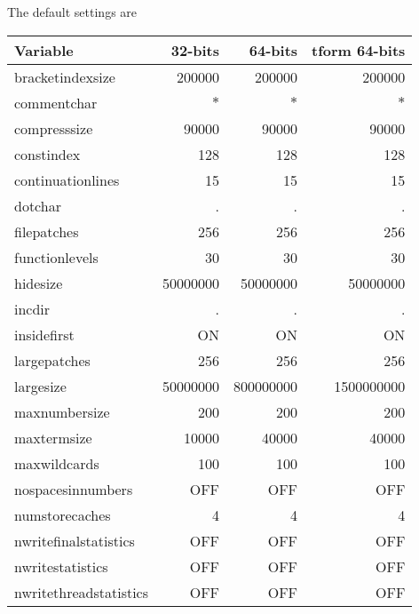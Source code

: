 The default settings are
\begin{center}
\begin{tabular}{lrrr}
Variable         &      32-bits       &    64-bits  & tform 64-bits   \\ \hline
bracketindexsize &      200000        & 200000      & 200000       \\
commentchar &           $*$           & $*$         & $*$          \\
compresssize &          90000         & 90000       & 90000        \\
constindex &            128           & 128         & 128          \\
continuationlines &     15            & 15          & 15           \\
dotchar &               .             & .           & .            \\
filepatches &           256           & 256         & 256          \\
functionlevels &        30            & 30          & 30           \\
hidesize &              50000000      & 50000000    & 50000000     \\
incdir &                .             & .           & .            \\
insidefirst &           ON            & ON          & ON           \\
largepatches &          256           & 256         & 256          \\
largesize &             50000000      & 800000000   & 1500000000   \\
maxnumbersize &         200           & 200         & 200          \\
maxtermsize &           10000         & 40000       & 40000        \\
maxwildcards &          100           & 100         & 100          \\
nospacesinnumbers &     OFF           & OFF         & OFF          \\
numstorecaches &        4             & 4           & 4            \\
nwritefinalstatistics & OFF           & OFF         & OFF          \\
nwritestatistics &      OFF           & OFF         & OFF          \\
nwritethreadstatistics &OFF           & OFF         & OFF          \\

\end{tabular}
\end{center}
